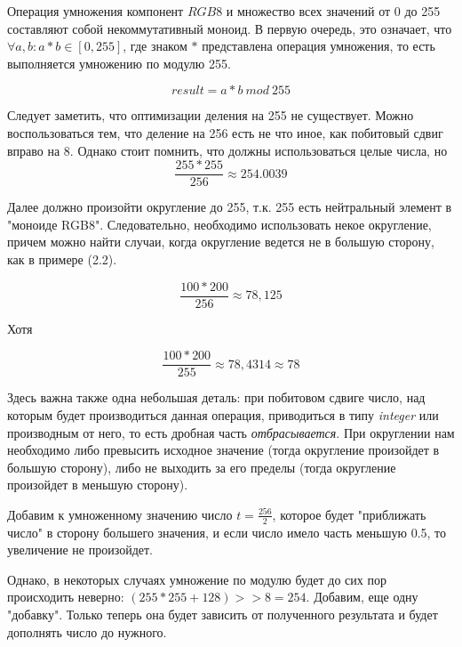 Операция умножения компонент $RGB8$ и множество всех значений от 0 до 255 составляют собой некоммутативный моноид. В первую очередь, это означает, что $\forall a, b : a * b \in [0, 255]$, где знаком $*$ представлена операция умножения, то есть выполняется умножению по модулю 255. 

\begin{equation}
result = a * b~mod~255
\end{equation}


Следует заметить, что оптимизации деления на 255 не существует. Можно воспользоваться тем, что деление на 256 есть не что иное, как побитовый сдвиг вправо на 8. Однако стоит помнить, что должны использоваться целые числа, но
\begin{equation}
 \frac{255*255}{256} \approx 254.0039
\end{equation}

Далее должно произойти округление до 255, т.к. 255 есть нейтральный элемент в "моноиде RGB8".
Следовательно, необходимо использовать некое округление, причем можно найти случаи, когда округление ведется не в большую сторону, как в примере (2.2).

\begin{equation}
\frac{100*200}{256} \approx 78,125
\end{equation}
 
 Хотя 
 
 \begin{equation}
 \frac{100*200}{255} \approx 78,4314 \approx 78
 \end{equation}
 
 Здесь важна также одна небольшая деталь: при побитовом сдвиге число, над которым будет производиться данная операция, приводиться в типу \textit{integer} или производным от него, то есть дробная часть \textit{отбрасывается}. При округлении нам необходимо либо превысить исходное значение (тогда округление произойдет в большую сторону), либо не выходить за его пределы (тогда округление произойдет в меньшую сторону). 
 
 Добавим к умноженному значению число $t = \frac{256}{2}$, которое будет "приближать число" в сторону большего значения, и если число имело часть меньшую 0.5, то увеличение не произойдет.
 
Однако, в некоторых случаях умножение по модулю будет до сих пор происходить неверно: $(255*255+128) >> 8 = 254$. Добавим, еще одну "добавку". Только теперь она будет зависить от полученного результата и будет дополнять число до нужного.

